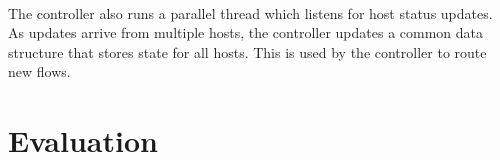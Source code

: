 \documentclass[10pt]{article}
\begin{document}
\paragraph{} The controller also runs a parallel thread which listens for host status updates. As updates arrive from multiple hosts, the controller updates a common data structure that stores state for all hosts. This is used by the controller to route new flows.

\section{Evaluation}
\label{sec:evaluation}

\paragraph{}
\end{document}

